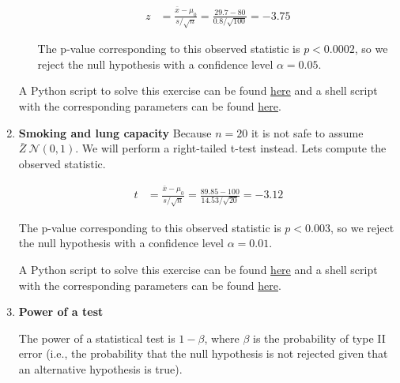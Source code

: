 \documentclass[12pt]{article}
\begin{document}
\begin{enumerate}
\begin{enumerate}[(a)]
                \begin{align*}
                    z &= \frac{\bar{x}-\mu_0}{s/\sqrt{n}}=\frac{29.7-80}{0.8/\sqrt{100}}=-3.75
                \end{align*}

                The p-value corresponding to this observed statistic is
                $p<0.0002$, so we reject the
                null hypothesis with a confidence level $\alpha=0.05$.

        \end{enumerate}

        A Python script to solve this exercise can be found
        \href{https://github.com/joacorapela/neuroinformatics24/blob/master/worksheets/01_tTestAndRandomizationTests/mySolution/code/doZTest.py}{here}
        and a shell script with the corresponding parameters can be found
        \href{https://github.com/joacorapela/neuroinformatics24/blob/master/worksheets/01_tTestAndRandomizationTests/mySolution/code/doEx3.csh}{here}.

    \item \textbf{Smoking and lung capacity}
        Because $n=20$ it is not safe to assume $\bar{Z}~\mathcal{N}(0,1)$. We
        will perform a right-tailed t-test instead. Lets compute the observed
        statistic.

        \begin{align*}
            t &= \frac{\bar{x}-\mu_0}{s/\sqrt{n}}=\frac{89.85-100}{14.53/\sqrt{20}}=-3.12
        \end{align*}

        The p-value corresponding to this observed statistic is
        $p<0.003$, so we reject the
        null hypothesis with a confidence level $\alpha=0.01$.

        A Python script to solve this exercise can be found
        \href{https://github.com/joacorapela/neuroinformatics24/blob/master/worksheets/01_tTestAndRandomizationTests/mySolution/code/doTTest.py}{here}
        and a shell script with the corresponding parameters can be found
        \href{https://github.com/joacorapela/neuroinformatics24/blob/master/worksheets/01_tTestAndRandomizationTests/mySolution/code/doEx4.csh}{here}.

    \item \textbf{Power of a test}

        The power of a statistical test is $1-\beta$, where $\beta$ is the
        probability of type II error (i.e., the probability that the null
        hypothesis is not rejected given that an alternative hypothesis is
        true).


\end{enumerate}
\end{document}
